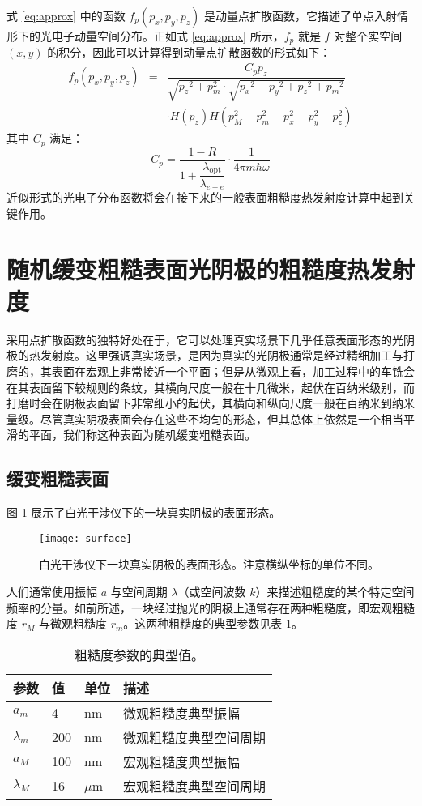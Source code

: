式 \ref{eq:approx} 中的函数 $f_p(p_x, p_y, p_z)$ 是动量点扩散函数，它描述了单点入射情形下的光电子动量空间分布。正如式 \ref{eq:approx} 所示，$f_p$ 就是 $f$ 对整个实空间 $(x, y)$ 的积分，因此可以计算得到动量点扩散函数的形式如下：
\begin{eqnarray}
f_p(p_x,p_y,p_z) &=& \dfrac{C_p p_z}{\sqrt{{p_z}^2+p_m^2}\cdot\sqrt{{p_x}^2+{p_y}^2+{p_z}^2+{p_m}^2}}\nonumber\\
&&\cdot H(p_z)H(p_M^2-p_m^2-p_x^2-p_y^2-p_z^2)
\label{eq:ppsf}
\end{eqnarray}
其中 $C_p$ 满足：
\[
C_p = \dfrac{1-R}{1+\dfrac{\lambda_{\text{opt}}}{\lambda_{e-e}}}\cdot\dfrac{1}{4\pi m\hbar\omega}
\]
近似形式的光电子分布函数将会在接下来的一般表面粗糙度热发射度计算中起到关键作用。

\section{\label{s:ana}随机缓变粗糙表面光阴极的粗糙度热发射度}
采用点扩散函数的独特好处在于，它可以处理真实场景下几乎任意表面形态的光阴极的热发射度。这里强调真实场景，是因为真实的光阴极通常是经过精细加工与打磨的，其表面在宏观上非常接近一个平面；但是从微观上看，加工过程中的车铣会在其表面留下较规则的条纹，其横向尺度一般在十几微米，起伏在百纳米级别，而打磨时会在阴极表面留下非常细小的起伏，其横向和纵向尺度一般在百纳米到纳米量级。尽管真实阴极表面会存在这些不均匀的形态，但其总体上依然是一个相当平滑的平面，我们称这种表面为随机缓变粗糙表面。

\subsection{缓变粗糙表面}
图 \ref{fig:rough} 展示了白光干涉仪下的一块真实阴极的表面形态。
\begin{figure}[htbp]
\centering
\texttt{[image: surface]}
\caption{\label{fig:rough} 白光干涉仪下一块真实阴极的表面形态。注意横纵坐标的单位不同。}
\end{figure}

人们通常使用振幅 $a$ 与空间周期 $\lambda$（或空间波数 $k$）来描述粗糙度的某个特定空间频率的分量。如前所述，一块经过抛光的阴极上通常存在两种粗糙度，即宏观粗糙度 $r_M$ 与微观粗糙度 $r_m$。这两种粗糙度的典型参数见表 \ref{tab:rough}。

\begin{table}[htbp]
\caption{\label{tab:rough}
粗糙度参数的典型值。}
\centering
\begin{tabular}{llll}
\toprule
参数 & 值 & 单位 & 描述 \\
\midrule
$a_m$ & 4 & nm & 微观粗糙度典型振幅 \\
$\lambda_m$ & 200 & nm & 微观粗糙度典型空间周期 \\
$a_M$ & 100 & nm & 宏观粗糙度典型振幅 \\
$\lambda_M$ & 16 & $\mu$m & 宏观粗糙度典型空间周期 \\
\bottomrule
\end{tabular}
\end{table}


